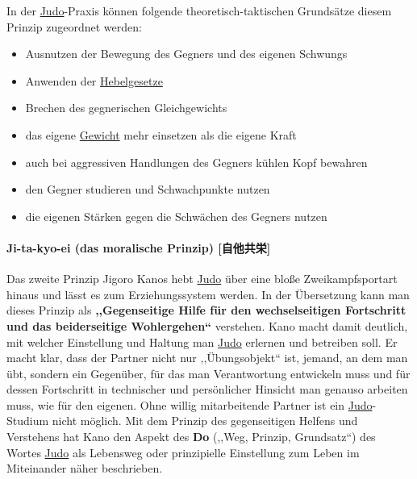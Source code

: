 \documentclass[justified, a4paper, notitlepage, captions=tableheading, nobib]{tufte-handout}
\begin{document}
In der \hyperref[org60aba15]{Judo}-Praxis können folgende theoretisch-taktischen Grundsätze diesem Prinzip zugeordnet werden: 
\begin{itemize}
\item Ausnutzen der Bewegung des Gegners und des eigenen Schwungs
\item Anwenden der \hyperref[org6c6f271]{Hebelgesetze}
\item Brechen des gegnerischen Gleichgewichts
\item das eigene \hyperref[org889513a]{Gewicht} mehr einsetzen als die eigene Kraft
\item auch bei aggressiven Handlungen des Gegners kühlen Kopf bewahren
\item den Gegner studieren und Schwachpunkte nutzen
\item die eigenen Stärken gegen die Schwächen des Gegners nutzen
\end{itemize}

\paragraph{\label{org2566ca3}Ji-ta-kyo-ei (das moralische Prinzip) [自他共栄]}
\label{sec:org33866cb}
Das zweite Prinzip Jigoro Kanos hebt \hyperref[org60aba15]{Judo} über eine bloße Zweikampfsportart hinaus und lässt es zum Erziehungssystem werden. In der Übersetzung kann man dieses Prinzip als \textbf{,,Gegenseitige Hilfe für den wechselseitigen Fortschritt und das beiderseitige Wohlergehen``} verstehen. Kano macht damit deutlich, mit welcher Einstellung und Haltung man \hyperref[org60aba15]{Judo} erlernen und betreiben soll. Er macht klar, dass der Partner nicht nur ,,Übungsobjekt`` ist, jemand, an dem man übt, sondern ein Gegenüber, für das man Verantwortung entwickeln muss und für dessen Fortschritt in technischer und persönlicher Hinsicht man genauso arbeiten muss, wie für den eigenen. Ohne willig mitarbeitende Partner ist ein \hyperref[org60aba15]{Judo}-Studium nicht möglich. Mit dem Prinzip des gegenseitigen Helfens und Verstehens hat Kano den Aspekt des \textbf{Do} (,,Weg, Prinzip, Grundsatz``) des Wortes \hyperref[org60aba15]{Judo} als Lebensweg oder prinzipielle Einstellung zum Leben im Miteinander näher beschrieben. 
\end{document}
